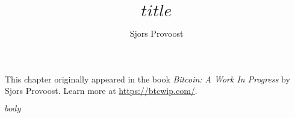 \documentclass[a4paper,twocolumn]{article}
\title{$title$}
\author{Sjors Provoost}
\begin{document}
\maketitle

This chapter originally appeared in the book \emph{Bitcoin: A Work In Progress} by Sjors Provoost. Learn more at \url{https://btcwip.com/}.

\bigskip

$body$
\end{document}
